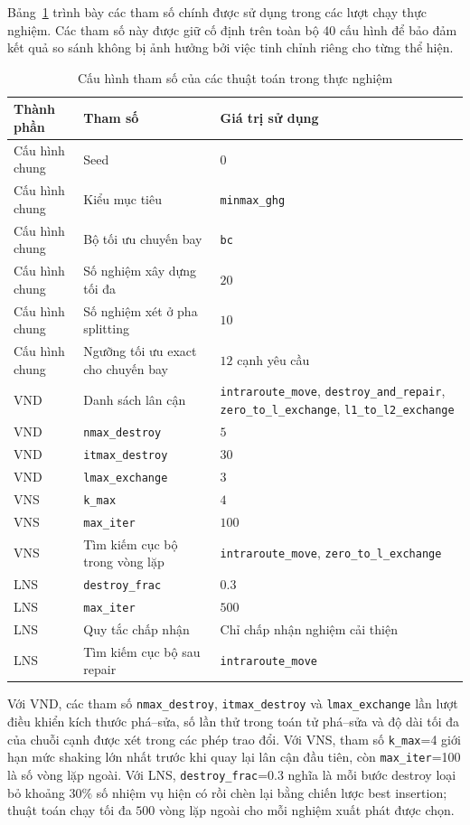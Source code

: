 Bảng~\ref{tab:algorithm-params} trình bày các tham số chính được sử dụng trong các lượt chạy thực nghiệm. Các tham số này được giữ cố định trên toàn bộ 40 cấu hình để bảo đảm kết quả so sánh không bị ảnh hưởng bởi việc tinh chỉnh riêng cho từng thể hiện.

\begin{table}[H]
\centering
\caption{Cấu hình tham số của các thuật toán trong thực nghiệm}
\label{tab:algorithm-params}
\begin{tabular}{p{3.0cm}p{4.2cm}p{6.0cm}}
\toprule
\textbf{Thành phần} & \textbf{Tham số} & \textbf{Giá trị sử dụng} \\
\midrule
Cấu hình chung & Seed & \(0\) \\
Cấu hình chung & Kiểu mục tiêu & \texttt{minmax\_ghg} \\
Cấu hình chung & Bộ tối ưu chuyến bay & \texttt{bc} \\
Cấu hình chung & Số nghiệm xây dựng tối đa & \(20\) \\
Cấu hình chung & Số nghiệm xét ở pha splitting & \(10\) \\
Cấu hình chung & Ngưỡng tối ưu exact cho chuyến bay & \(12\) cạnh yêu cầu \\
VND & Danh sách lân cận & \texttt{intraroute\_move}, \texttt{destroy\_and\_repair}, \texttt{zero\_to\_l\_exchange}, \texttt{l1\_to\_l2\_exchange} \\
VND & \texttt{nmax\_destroy} & \(5\) \\
VND & \texttt{itmax\_destroy} & \(30\) \\
VND & \texttt{lmax\_exchange} & \(3\) \\
VNS & \texttt{k\_max} & \(4\) \\
VNS & \texttt{max\_iter} & \(100\) \\
VNS & Tìm kiếm cục bộ trong vòng lặp & \texttt{intraroute\_move}, \texttt{zero\_to\_l\_exchange} \\
LNS & \texttt{destroy\_frac} & \(0.3\) \\
LNS & \texttt{max\_iter} & \(500\) \\
LNS & Quy tắc chấp nhận & Chỉ chấp nhận nghiệm cải thiện \\
LNS & Tìm kiếm cục bộ sau repair & \texttt{intraroute\_move} \\
\bottomrule
\end{tabular}
\end{table}

Với VND, các tham số \texttt{nmax\_destroy}, \texttt{itmax\_destroy} và \texttt{lmax\_exchange} lần lượt điều khiển kích thước phá--sửa, số lần thử trong toán tử phá--sửa và độ dài tối đa của chuỗi cạnh được xét trong các phép trao đổi. Với VNS, tham số \texttt{k\_max}=4 giới hạn mức shaking lớn nhất trước khi quay lại lân cận đầu tiên, còn \texttt{max\_iter}=100 là số vòng lặp ngoài. Với LNS, \texttt{destroy\_frac}=0.3 nghĩa là mỗi bước destroy loại bỏ khoảng \(30\%\) số nhiệm vụ hiện có rồi chèn lại bằng chiến lược best insertion; thuật toán chạy tối đa \(500\) vòng lặp ngoài cho mỗi nghiệm xuất phát được chọn.

